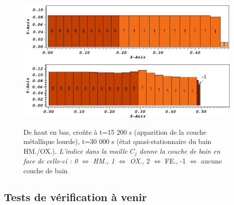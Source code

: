 \begin{figure}[H]
\centering
\includegraphics[width=\textwidth, keepaspectratio=true]{Figures/coriumCrust_15200.png} \\
\includegraphics[width=\textwidth, keepaspectratio=true]{Figures/coriumCrust_30000.png}
\caption{De haut en bas, croûte à t=15 200 s (apparition de la couche métallique lourde), t=30 000 s (état quasi-stationnaire du bain HM./OX.). \textit{L'indice dans la maille $C_j$ donne la couche de bain en face de celle-ci : 0 $\Leftrightarrow$ HM., 1 $\Leftrightarrow$ OX.}, 2  $\Leftrightarrow$ FE., -1 $\Leftrightarrow$ aucune couche de bain}
\label{fig:croutes_2}
\end{figure}


\subsection{Tests de vérification à venir}

